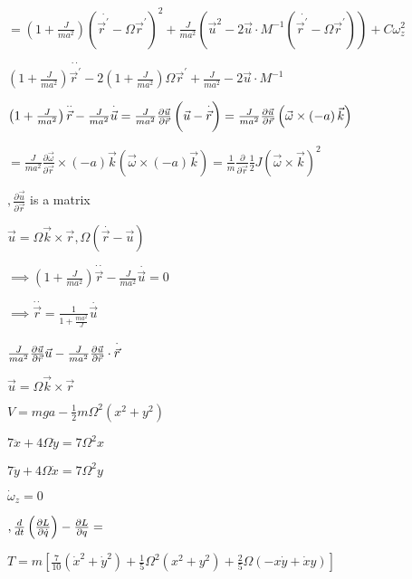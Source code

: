 \documentclass{article}
\begin{document}
$=\left( 1+\frac{J}{ma^{2}}\right) \left( \overset{\cdot }{\vec{r}^{\prime }}%
-\Omega \vec{r}^{\prime }\right) ^{2}+\frac{J}{ma^{2}}\left( \vec{u}^{2}-2%
\vec{u}\cdot M^{-1}\left( \overset{\cdot }{\vec{r}^{\prime }}-\Omega \vec{r}%
^{\prime }\right) \right) +C\omega _{z}^{2}$

$\left( 1+\frac{J}{ma^{2}}\right) \overset{\cdot \cdot }{\vec{r}^{\prime }}%
-2\left( 1+\frac{J}{ma^{2}}\right) \Omega \vec{r}^{\prime }+\frac{J}{ma^{2}}%
-2\vec{u}\cdot M^{-1}$

$\left( 1+\frac{J}{ma^{2}}\right) \overset{\cdot \cdot }{\vec{r}}-\frac{J}{%
ma^{2}}\overset{\cdot }{\vec{u}}=\frac{J}{ma^{2}}\frac{\partial \vec{u}}{%
\partial \vec{r}}\left( \vec{u}-\overset{\cdot }{\vec{r}}\right) =\frac{J}{%
ma^{2}}\frac{\partial \vec{u}}{\partial \vec{r}}\left( \vec{\omega}\times
\left( -a\right) \vec{k}\right) $

$=\frac{J}{ma^{2}}\frac{\partial \vec{\omega}}{\partial \vec{r}}\times
\left( -a\right) \vec{k}\left( \vec{\omega}\times \left( -a\right) \vec{k}%
\right) =\frac{1}{m}\frac{\partial }{\partial \vec{r}}\frac{1}{2}J\left( 
\vec{\omega}\times \vec{k}\right) ^{2}$

$,\frac{\partial \vec{u}}{\partial \vec{r}}$ is a matrix 

$\vec{u}=\Omega \vec{k}\times \vec{r},\Omega \left( \overset{\cdot }{\vec{r}}%
-\vec{u}\right) $

$\implies \left( 1+\frac{J}{ma^{2}}\right) \overset{\cdot \cdot }{\vec{r}}-%
\frac{J}{ma^{2}}\overset{\cdot }{\vec{u}}=0$

$\implies \overset{\cdot \cdot }{\vec{r}}=\frac{1}{1+\frac{ma^{2}}{J}}%
\overset{\cdot }{\vec{u}}$

$\frac{J}{ma^{2}}\frac{\partial \vec{u}}{\partial \vec{r}}\vec{u}-\frac{J}{%
ma^{2}}\frac{\partial \vec{u}}{\partial \vec{r}}\cdot \overset{\cdot }{\vec{r%
}}$

$\vec{u}=\Omega \vec{k}\times \vec{r}$

$V=mga-\frac{1}{2}m\Omega ^{2}\left( x^{2}+y^{2}\right) $

$7\ddot{x}+4\Omega \dot{y}=7\Omega ^{2}x$

$7\ddot{y}+4\Omega \dot{x}=7\Omega ^{2}y$

$\dot{\omega}_{z}=0$

$,\frac{d}{dt}\left( \frac{\partial L}{\partial \dot{q}}\right) -\frac{%
\partial L}{\partial q}=$

$T=m\left[ \frac{7}{10}\left( \dot{x}^{2}+\dot{y}^{2}\right) +\frac{1}{5}%
\Omega ^{2}\left( x^{2}+y^{2}\right) +\frac{2}{5}\Omega \left( -x\dot{y}+%
\dot{x}y\right) \right] $
\end{document}
